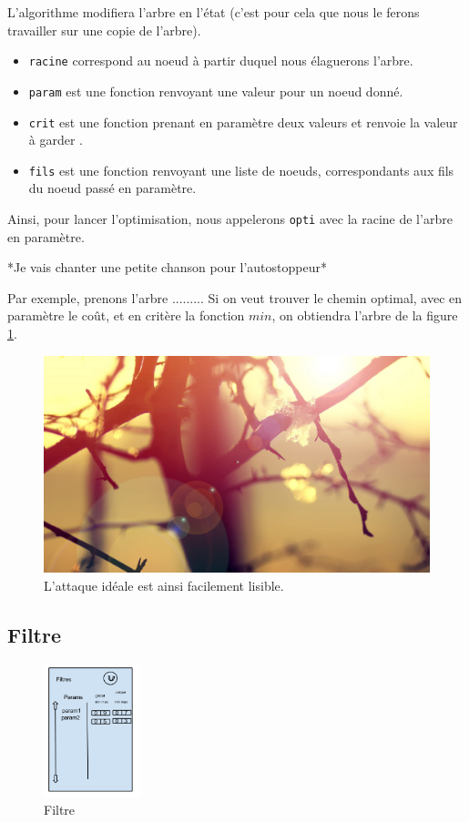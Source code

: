 		L'algorithme modifiera l'arbre en l'état (c'est pour cela que nous le ferons travailler sur une copie de l'arbre).
		\begin{itemize}
			\item \verb|racine| correspond au noeud à partir duquel nous élaguerons l'arbre.
			\item \verb|param| est une fonction renvoyant une valeur pour un noeud donné.
			\item \verb|crit| est une fonction prenant en paramètre deux valeurs et renvoie la valeur à \og garder \fg.
			\item \verb|fils| est une fonction renvoyant une liste de noeuds, correspondants aux fils du noeud passé en paramètre.
		\end{itemize}
		Ainsi, pour lancer l'optimisation, nous appelerons \verb|opti| avec la racine de l'arbre en paramètre.

		*Je vais chanter une petite chanson pour l'autostoppeur*

		Par exemple, prenons l'arbre .........
		Si on veut trouver le chemin optimal, avec en paramètre le coût, et en critère la fonction $min$, on obtiendra l'arbre de la figure \ref{fig:arbre_post_opti}.

		\begin{figure}
			\centering
			\includegraphics[width=1\textwidth]{figure/arbre_post_opti.jpg}
			\caption{L'attaque idéale est ainsi facilement lisible.}
			\label{fig:arbre_post_opti}
		\end{figure}


	\subsection{Filtre}
		\begin{figure}
			\begin{center}
				\includegraphics[width=0.25\textwidth]{figure/filtre.png}
			\end{center}
			\caption{Filtre}
			\label{fig:filtre}
		\end{figure}


